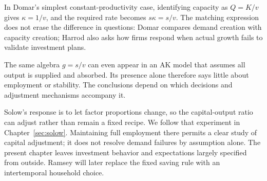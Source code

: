 In Domar's simplest constant-productivity case, identifying capacity as
$Q=K/v$ gives $\kappa=1/v$, and the required rate becomes $s\kappa=s/v$.
The matching expression does not erase the difference in questions: Domar
compares demand creation with capacity creation; Harrod also asks how firms
respond when actual growth fails to validate investment plans.

The same algebra $g=s/v$ can even appear in an AK model that assumes all output
is supplied and absorbed. Its presence alone therefore says little about
employment or stability. The conclusions depend on which decisions and
adjustment mechanisms accompany it.

Solow's response is to let factor proportions change, so the capital-output
ratio can adjust rather than remain a fixed recipe. We follow that experiment
in Chapter~\ref{sec:solow}. Maintaining full employment there permits a clear
study of capital adjustment; it does not resolve demand failures by assumption
alone. The present chapter leaves investment behavior and expectations largely
specified from outside. Ramsey will later replace the fixed saving rule with
an intertemporal household choice.
